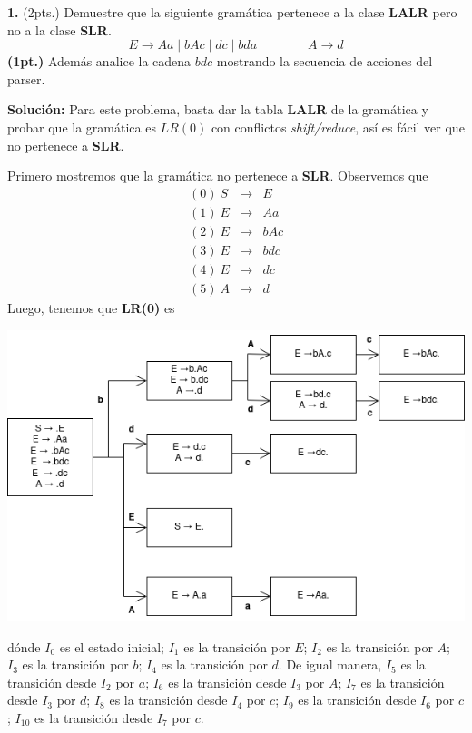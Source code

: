 \textbf{1.} {(2pts.)} Demuestre que la siguiente gram\'atica pertenece a la 
clase \textbf{LALR} pero no a la clase \textbf{SLR}.
\[
E \to Aa \mid bAc \mid dc \mid  bda \qquad \qquad A \to  d 
\]
\textbf{(1pt.)} Adem\'as analice la cadena $bdc$ mostrando la secuencia de
acciones del parser.\newline

\textbf{Solución:} Para este problema, basta dar la tabla \textbf{LALR} de la gramática
y probar que la gramática es $LR(0)$ con conflictos \textit{shift/reduce}, así es fácil
ver que no pertenece a \textbf{SLR}. \newline

Primero mostremos que la gramática no pertenece a \textbf{SLR}.
Observemos que
\begin{eqnarray*}
        (0)\: S &\rightarrow& E\\
        (1)\: E &\rightarrow& Aa\\
        (2)\: E &\rightarrow& bAc\\
        (3)\: E &\rightarrow& bdc\\
        (4)\: E &\rightarrow& dc\\
        (5)\: A &\rightarrow& d
\end{eqnarray*}
Luego, tenemos que \textbf{LR(0)} es
\begin{center}
        \includegraphics[width=.85\textwidth]{./LR(0).png}
\end{center}
dónde $I_0$ es el estado inicial; $I_1$ es la transición por $E$; $I_2$ es la transición por $A$;
$I_3$ es la transición por $b$; $I_4$ es la transición por $d$. De igual manera, $I_5$ es la transición
desde $I_2$ por $a$; $I_6$ es la transición desde $I_3$ por $A$; $I_7$ es la transición desde
$I_3$ por $d$; $I_8$ es la transición desde $I_4$ por $c$; $I_9$ es la transición desde $I_6$ por
$c$; $I_10$ es la transición desde $I_7$ por $c$.\newline

